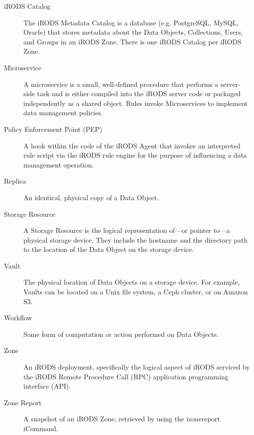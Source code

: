 \documentclass[10pt,oneside]{memoir}
\begin{document}
\begin{description}
\item [iRODS Catalog]
The iRODS Metadata Catalog is a database (e.g. PostgreSQL, MySQL, Oracle) that stores metadata about the Data Objects, Collections, Users, and Groups in an iRODS Zone. There is one iRODS Catalog per iRODS Zone.

\item [Microservice]
A microservice is a small, well-defined procedure that performs a server-side task and is either compiled into the iRODS server code or packaged independently as a shared object. Rules invoke Microservices to implement data management policies.

\item [Policy Enforcement Point (PEP)]
A hook within the code of the iRODS Agent that invokes an interpreted rule script via the iRODS rule engine for the purpose of influencing a data management operation.

\item [Replica]
An identical, physical copy of a Data Object.

\item [Storage Resource]
A Storage Resource is the logical representation of---or pointer to---a physical storage device. They include the hostname and the directory path to the location of the Data Object on the storage device.

\item [Vault]
The physical location of Data Objects on a storage device. For example, Vaults can be located on a Unix file system, a Ceph cluster, or on Amazon S3.

\item [Workflow]
Some form of computation or action performed on Data Objects.

\item [Zone]
An iRODS deployment, specifically the logical aspect of iRODS serviced by the iRODS Remote Procedure Call (RPC) application programming interface (API).

\item [Zone Report]
A snapshot of an iRODS Zone, retrieved by using the izonereport iCommand.

\end{description}
\end{document}
